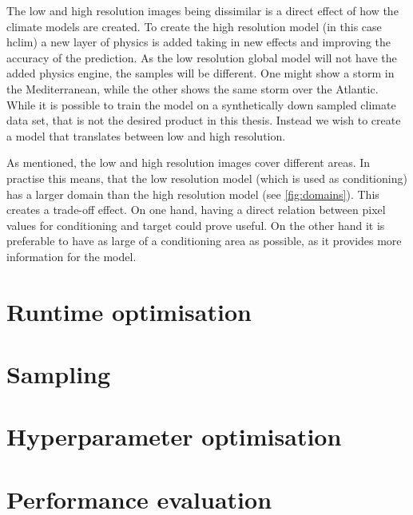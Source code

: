 The low and high resolution images being dissimilar is a direct effect of how the climate models are created. To create the high resolution model (in this case \gls{hclim}) a new layer of physics is added taking in new effects and improving the accuracy of the prediction. As the low resolution global model will not have the added physics engine, the samples will be different. One might show a storm in the Mediterranean, while the other shows the same storm over the Atlantic.
While it is possible to train the model on a synthetically down sampled climate data set, that is not the desired product in this thesis. Instead we wish to create a model that translates between low and high resolution. 

As mentioned, the low and high resolution images cover different areas. In practise this means, that the low resolution model (which is used as conditioning) has a larger domain than the high resolution model (see \cref{fig:domains}). This creates a trade-off effect. On one hand, having a direct relation between pixel values for conditioning and target could prove useful. On the other hand it is preferable to have as large of a conditioning area as possible, as it provides more information for the model. 

\section{Runtime optimisation}

\section{Sampling}

\section{Hyperparameter optimisation}

\section{Performance evaluation}
